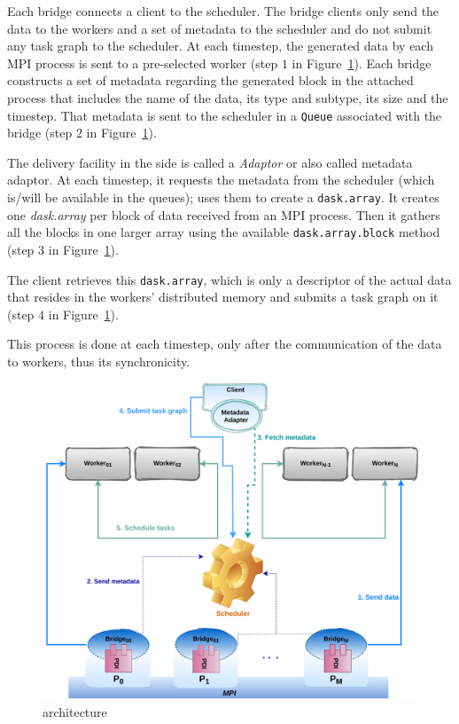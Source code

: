 Each bridge connects a \dask client to the scheduler. The bridge clients only send the data to the workers and a set of metadata to the scheduler and do not submit any task graph to the scheduler. 
At each timestep, the generated data by each MPI process is sent to a pre-selected \dask worker (step $1$ in Figure~\ref{figdeida}). Each bridge constructs a set of metadata regarding the generated block in the attached process that includes the name of the data, its type and subtype, its size and the timestep. That metadata is sent to the scheduler in a \dask \texttt{Queue} associated with the bridge (step $2$ in Figure~\ref{figdeida}). 

The delivery facility in the \dask side is called a \deisa \textit{Adaptor} or also called metadata adaptor. At each timestep, it requests the metadata from the scheduler (which is/will be available in the queues); uses them to create a \texttt{dask.array}. It creates one \textit{dask.array} per block of data received from an MPI process. Then it gathers all the blocks in one larger array using the available \texttt{dask.array.block} method (step $3$ in Figure~\ref{figdeida}). 

The client retrieves this \texttt{dask.array}, which is only a descriptor of the actual data that resides in the workers' distributed memory and submits a task graph on it (step $4$ in Figure~\ref{figdeida}). 

This process is done at each timestep, only after the communication of the data to \dask workers, thus its synchronicity. 


\begin{figure}\centering
\includegraphics[width=\columnwidth]{figures/DeisaV1.pdf}
\caption{\deisa architecture}
\label{figdeida}
\end{figure}



